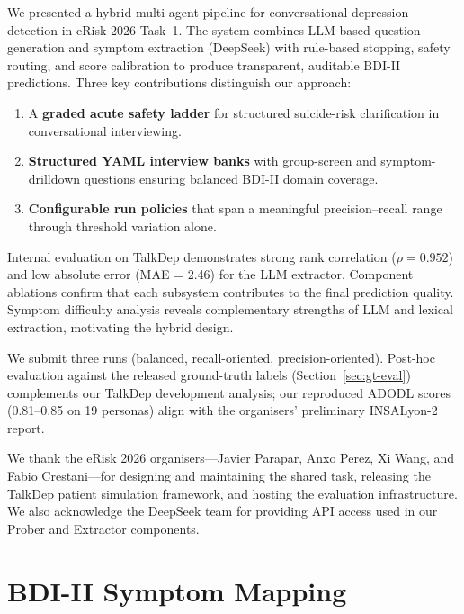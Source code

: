 \documentclass[]{ceurart}
\begin{document}
We presented a hybrid multi-agent pipeline for conversational depression detection in eRisk 2026 Task~1.
The system combines LLM-based question generation and symptom extraction (DeepSeek) with rule-based stopping, safety routing, and score calibration to produce transparent, auditable BDI-II predictions.
Three key contributions distinguish our approach:

\begin{enumerate}
\item A \textbf{graded acute safety ladder} for structured suicide-risk clarification in conversational interviewing.
\item \textbf{Structured YAML interview banks} with group-screen and symptom-drilldown questions ensuring balanced BDI-II domain coverage.
\item \textbf{Configurable run policies} that span a meaningful precision--recall range through threshold variation alone.
\end{enumerate}

Internal evaluation on TalkDep demonstrates strong rank correlation ($\rho = 0.952$) and low absolute error (MAE = 2.46) for the LLM extractor.
Component ablations confirm that each subsystem contributes to the final prediction quality.
Symptom difficulty analysis reveals complementary strengths of LLM and lexical extraction, motivating the hybrid design.

We submit three runs (balanced, recall-oriented, precision-oriented).
Post-hoc evaluation against the released ground-truth labels (Section~\ref{sec:gt-eval}) complements our TalkDep development analysis; our reproduced ADODL scores (0.81--0.85 on 19 personas) align with the organisers' preliminary INSALyon-2 report.

\begin{acknowledgments}
We thank the eRisk 2026 organisers---Javier Parapar, Anxo Perez, Xi Wang, and Fabio Crestani---for designing and maintaining the shared task, releasing the TalkDep patient simulation framework, and hosting the evaluation infrastructure.
We also acknowledge the DeepSeek team for providing API access used in our Prober and Extractor components.
\end{acknowledgments}



\appendix

\section{BDI-II Symptom Mapping}\label{app:bdi}
\end{document}

